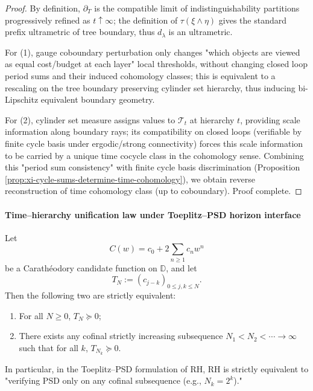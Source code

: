 \begin{proof}
By definition, \(\partial_T\) is the compatible limit of indistinguishability partitions progressively refined as \(t\uparrow\infty\); the definition of \(\tau(\xi\wedge\eta)\) gives the standard prefix ultrametric of tree boundary, thus \(d_\lambda\) is an ultrametric.
\par
For (1), gauge coboundary perturbation only changes "which objects are viewed as equal cost/budget at each layer" local thresholds, without changing closed loop period sums and their induced cohomology classes; this is equivalent to a rescaling on the tree boundary preserving cylinder set hierarchy, thus inducing bi-Lipschitz equivalent boundary geometry.
\par
For (2), cylinder set measure assigns values to \(\mathcal T_t\) at hierarchy \(t\), providing scale information along boundary rays; its compatibility on closed loops (verifiable by finite cycle basis under ergodic/strong connectivity) forces this scale information to be carried by a unique time cocycle class in the cohomology sense.
Combining this "period sum consistency" with finite cycle basis discrimination (Proposition \ref{prop:xi-cycle-sums-determine-time-cohomology}), we obtain reverse reconstruction of time cohomology class (up to coboundary). Proof complete.
\end{proof}







\paragraph{Time--hierarchy unification law under Toeplitz--PSD horizon interface}

\begin{theorem}\label{thm:xi-toeplitz-psd-cofinal-sparsification}
Let
\[
C(w)=c_0+2\sum_{n\ge 1}c_n w^n
\]
be a Carathéodory candidate function on \(\mathbb D\), and let
\[
T_N:=(c_{j-k})_{0\le j,k\le N}.
\]
Then the following two are strictly equivalent:
\begin{enumerate}
  \item For all \(N\ge 0\), \(T_N\succeq 0\);
  \item There exists any cofinal strictly increasing subsequence \(N_1<N_2<\cdots\to\infty\) such that for all \(k\), \(T_{N_k}\succeq 0\).
\end{enumerate}
In particular, in the Toeplitz--PSD formulation of RH, RH is strictly equivalent to "verifying PSD only on any cofinal subsequence (e.g., \(N_k=2^k\))."
\end{theorem}


